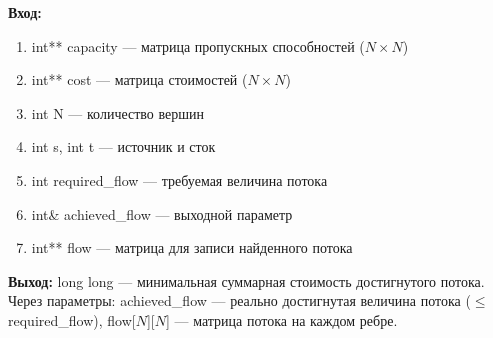 \noindent\textbf{Вход:}
\begin{enumerate}
	\item int** capacity — матрица пропускных способностей ($N \times N$)
	\item int** cost — матрица стоимостей ($N \times N$)
	\item int N — количество вершин
	\item int s, int t — источник и сток
	\item int required\_flow — требуемая величина потока
	\item int\& achieved\_flow — выходной параметр
	\item int** flow — матрица для записи найденного потока
\end{enumerate}
\noindent\textbf{Выход:}
long long — минимальная суммарная стоимость достигнутого потока. \\
Через параметры: achieved\_flow — реально достигнутая величина потока ($\le$ required\_flow), flow[$N$][$N$] — матрица потока на каждом ребре.

